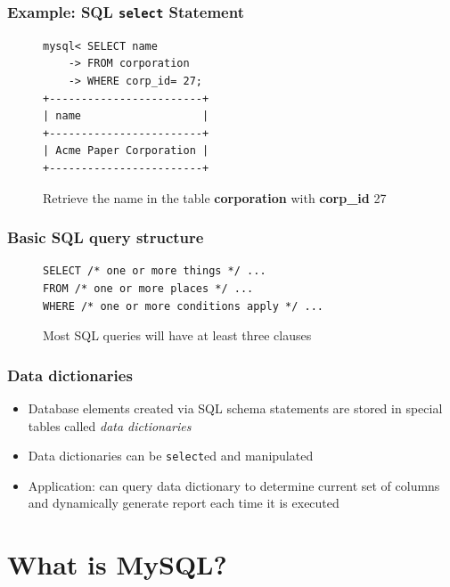 \documentclass{beamer}
\begin{document}
\begin{frame}[fragile]
\frametitle{Example: SQL \texttt{select} Statement}
\begin{figure}
\begin{lstlisting}
mysql< SELECT name
	-> FROM corporation
	-> WHERE corp_id= 27;
+------------------------+
| name                   |
+------------------------+
| Acme Paper Corporation |
+------------------------+
\end{lstlisting}
\caption{Retrieve the name in the table \textbf{corporation} with \textbf{corp\_id} 27}
\end{figure}
\end{frame}

\begin{frame}[fragile]
\frametitle{Basic SQL query structure}
\begin{figure}
\begin{lstlisting}
SELECT /* one or more things */ ...
FROM /* one or more places */ ...
WHERE /* one or more conditions apply */ ...
\end{lstlisting}
\caption{Most SQL queries will have at least three clauses}
\end{figure}
\end{frame}

\begin{frame}
\frametitle{Data dictionaries}
\begin{itemize}
	\item Database elements created via SQL schema statements are stored in special tables called \textit{data dictionaries}
	\item Data dictionaries can be \texttt{select}ed and manipulated
	\item Application: can query data dictionary to determine current set of columns and dynamically generate report each time it is executed
\end{itemize}
\end{frame}

\section{What is MySQL?}
\end{document}
